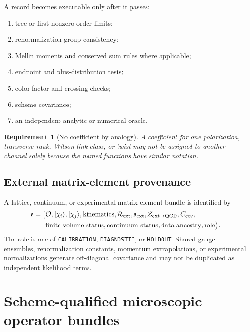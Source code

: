 \documentclass[11pt]{article}
\newtheorem{requirement}[definition]{Requirement}
\newcommand{\QCD}{\mathrm{QCD}}
\newcommand{\cO}{\mathcal O}
\newcommand{\cR}{\mathcal R}
\newcommand{\cZ}{\mathcal Z}
\begin{document}
A record becomes executable only after it passes:
\begin{enumerate}
\item tree or first-nonzero-order limits;
\item renormalization-group consistency;
\item Mellin moments and conserved sum rules where applicable;
\item endpoint and plus-distribution tests;
\item color-factor and crossing checks;
\item scheme covariance;
\item an independent analytic or numerical oracle.
\end{enumerate}

\begin{requirement}[No coefficient by analogy]
A coefficient for one polarization, transverse rank, Wilson-link class, or twist may not be assigned to another channel solely because the named functions have similar notation.
\end{requirement}

\subsection{External matrix-element provenance}

A lattice, continuum, or experimental matrix-element bundle is identified by
\begin{equation}
 \begin{aligned}
 \mathfrak e=\bigl(&
 \cO,|\chi_i\rangle,|\chi_j\rangle,
 \text{kinematics},
 \cR_{\rm ext},\mathfrak s_{\rm ext},
 \cZ_{\rm ext\to\QCD},C_{\rm cov},\notag\\
 &\text{finite-volume status},
 \text{continuum status},
 \text{data ancestry},
 \text{role}\bigr).
 \end{aligned}
 \label{eq:external-bundle}
\end{equation}
The role is one of \texttt{CALIBRATION}, \texttt{DIAGNOSTIC}, or \texttt{HOLDOUT}.  Shared gauge ensembles, renormalization constants, momentum extrapolations, or experimental normalizations generate off-diagonal covariance and may not be duplicated as independent likelihood terms.

\section{Scheme-qualified microscopic operator bundles}
\label{sec:qualified-bundle}
\end{document}
